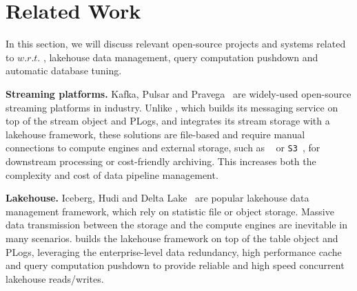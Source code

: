 \section{Related Work} 
\label{sec:related}


In this section, we will discuss relevant open-source projects and systems related to \sys $w.r.t.$ , lakehouse data management, query computation pushdown and automatic database tuning.




\noindent\textbf{Streaming platforms.} Kafka, Pulsar and Pravega~\cite{} are widely-used open-source streaming platforms in industry. Unlike \sys, which builds its messaging service on top of the stream object and PLogs, and integrates its stream storage with a lakehouse framework, these solutions are file-based and require manual connections to compute engines and external storage, such as \hdfs~\cite{} or \texttt{S3}~\cite{}, for downstream processing or cost-friendly archiving. This increases both the complexity and cost of data pipeline management.



\noindent\textbf{Lakehouse.} Iceberg, Hudi and Delta Lake~\cite{} are popular  lakehouse data management framework, which rely on statistic file or object storage. 
Massive data transmission between the storage and the compute engines are inevitable in many scenarios. 
 \sys builds the lakehouse framework on top of the table object and PLogs, leveraging the enterprise-level data redundancy, high performance cache and query computation pushdown to provide reliable and high speed concurrent lakehouse reads/writes. 









